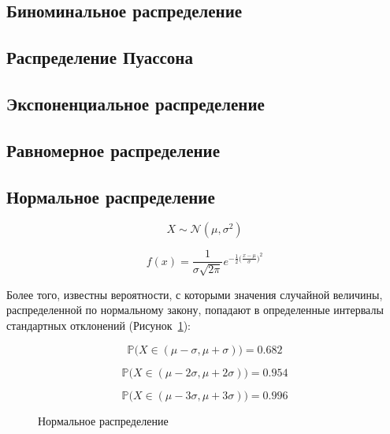 \documentclass[
  letterpaper,
  DIV=11,
  numbers=noendperiod]{scrreprt}
\newcommand{\prob}{\mathbb{P}}
\newcommand{\norm}{\mathcal{N}}
\theoremstyle{definition}
\theoremstyle{remark}
\begin{document}
\subsection{Биноминальное распределение}\label{stats-rand-values-binom}

\subsection{Распределение Пуассона}\label{stats-rand-values-pois}

\subsection{Экспоненциальное распределение}\label{stats-rand-values-exp}

\subsection{Равномерное распределение}\label{stats-rand-values-uniform}

\subsection{Нормальное распределение}\label{stats-rand-values-norm}

\[
X \sim \norm(\mu, \sigma^2)
\]

\[
f(x) = \frac{1}{\sigma \sqrt{2\pi}}e^{-\frac{1}{2}\big(\frac{x - \mu}{\sigma}\big)^2}
\]

Более того, известны вероятности, с которыми значения случайной
величины, распределенной по нормальному закону, попадают в определенные
интервалы стандартных отклонений (Рисунок~\ref{fig-norm}):

\[
\prob \big( X \in (\mu\!-\!\sigma, \mu\!+\!\sigma) \big) = 0.682
\]

\[
\prob \big( X \in (\mu\!-\!2\sigma, \mu\!+\!2\sigma) \big) = 0.954
\]

\[
\prob \big( X \in (\mu\!-\!3\sigma, \mu\!+\!3\sigma) \big) = 0.996
\]

\begin{figure}


\caption{\label{fig-norm}Нормальное распределение}

\end{figure}%
\end{document}
